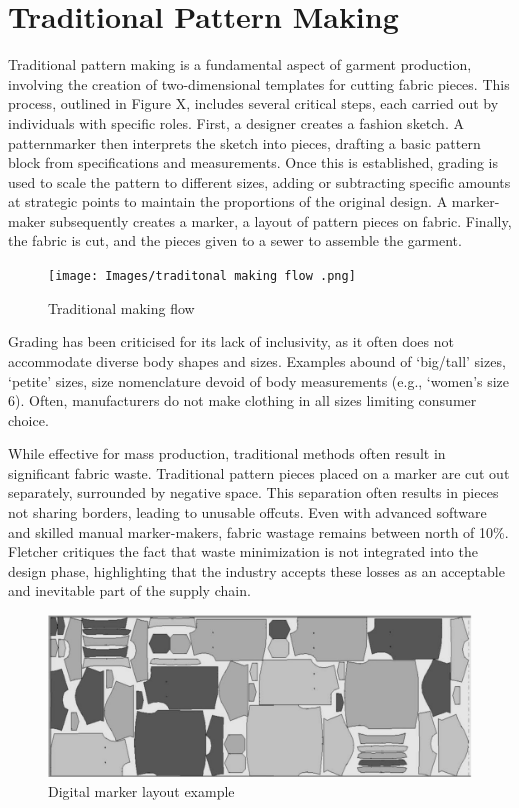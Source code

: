 \section{Traditional Pattern Making}
Traditional pattern making is a fundamental aspect of garment production, involving the creation of two-dimensional templates for cutting fabric pieces. This process, outlined in Figure X, includes several critical steps, each carried out by individuals with specific roles. First, a designer creates a fashion sketch. A patternmarker then interprets the sketch into pieces, drafting a basic pattern block from specifications and measurements. Once this is established, grading is used to scale the pattern to different sizes, adding or subtracting specific amounts at strategic points to maintain the proportions of the original design. A marker-maker subsequently creates a marker, a layout of pattern pieces on fabric. Finally, the fabric is cut, and the pieces given to a sewer to assemble the garment.
\begin{figure} [H]
    \centering
    \texttt{[image: Images/traditonal making flow .png]}
    \caption{Traditional making flow}
\end{figure}
Grading has been criticised for its lack of inclusivity, as it often does not accommodate diverse body shapes and sizes. Examples abound of ‘big/tall’ sizes, ‘petite’ sizes, size nomenclature devoid of body measurements (e.g., ‘women’s size 6). Often, manufacturers do not make clothing in all sizes limiting consumer choice.

While effective for mass production, traditional methods often result in significant fabric waste. Traditional pattern pieces placed on a marker are cut out separately, surrounded by negative space. This separation often results in pieces not sharing borders, leading to unusable offcuts.  Even with advanced software and skilled manual marker-makers, fabric wastage remains between north of 10\%. Fletcher critiques the fact that waste minimization is not integrated into the design phase, highlighting that the industry accepts these losses as an acceptable and inevitable part of the supply chain.
\begin{figure} [H]
    \centering
    \includegraphics[width=\textwidth]{Images/digital marker layout.png}
    \caption{Digital marker layout example}
\end{figure}

